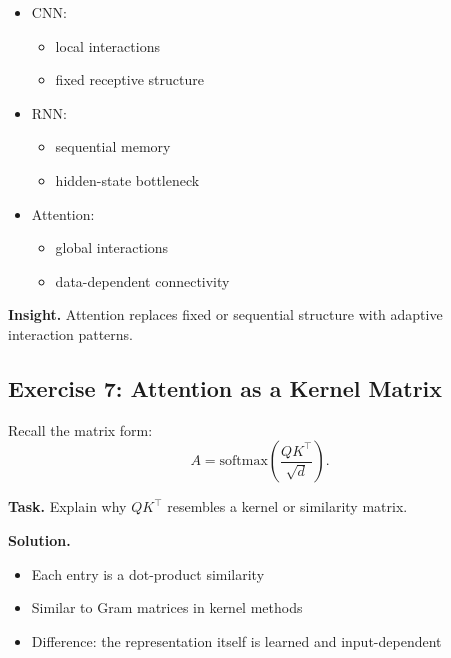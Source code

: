 \begin{itemize}
    \item CNN:
    \begin{itemize}
        \item local interactions
        \item fixed receptive structure
    \end{itemize}

    \item RNN:
    \begin{itemize}
        \item sequential memory
        \item hidden-state bottleneck
    \end{itemize}

    \item Attention:
    \begin{itemize}
        \item global interactions
        \item data-dependent connectivity
    \end{itemize}
\end{itemize}

\medskip

\noindent
\textbf{Insight.}  
Attention replaces fixed or sequential structure with adaptive interaction patterns.

\subsection{Exercise 7: Attention as a Kernel Matrix}

Recall the matrix form:
\[
A = \text{softmax}\left(\frac{QK^\top}{\sqrt{d}}\right).
\]

\medskip

\noindent
\textbf{Task.}  
Explain why $QK^\top$ resembles a kernel or similarity matrix.

\medskip

\noindent
\textbf{Solution.}

\begin{itemize}
    \item Each entry is a dot-product similarity
    \item Similar to Gram matrices in kernel methods
    \item Difference: the representation itself is learned and input-dependent
\end{itemize}

\medskip

